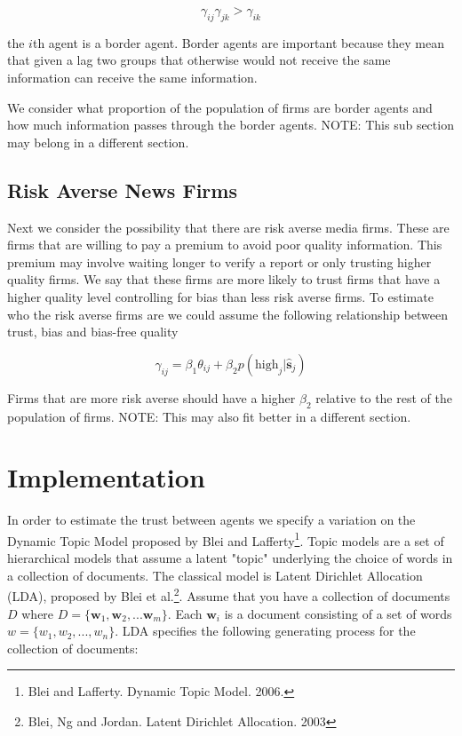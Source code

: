 \documentclass[a4paper]{article}
\begin{document}
\[\gamma_{ij}\gamma_{jk} > \gamma_{ik}\]

the $i$th agent is a border agent.  Border agents are important because they mean that given a lag two groups that otherwise would not receive the same information can receive the same information.

We consider what proportion of the population of firms are border agents and how much information passes through the border agents.  NOTE: This sub section may belong in a different section.

\subsection{Risk Averse News Firms}

Next we consider the possibility that there are risk averse media firms.  These are firms that are willing to pay a premium to avoid poor quality information.  This premium may involve waiting longer to verify a report or only trusting higher quality firms.  We say that these firms are more likely to trust firms that have a higher quality level controlling for bias than less risk averse firms.  To estimate who the risk averse firms are we could assume the following relationship between trust, bias and bias-free quality

\[\gamma_{ij} = \beta_1 \theta_{ij} + \beta_2 p(\text{high}_j|\hat{\textbf{s}}_j)\]

Firms that are more risk averse should have a higher $\beta_2$ relative to the rest of the population of firms. NOTE: This may also fit better in a different section.

\section{Implementation}

In order to estimate the trust between agents we specify a variation on the Dynamic Topic Model proposed by Blei and Lafferty\footnote{Blei and Lafferty. Dynamic Topic Model. 2006.}.  Topic models are a set of hierarchical models that assume a latent "topic" underlying the choice of words in a collection of documents.  The classical model is Latent Dirichlet Allocation (LDA), proposed by Blei et al.\footnote{Blei, Ng and Jordan. Latent Dirichlet Allocation. 2003}.  Assume that you have a collection of documents $D$ where $D = \{\textbf{w}_1, \textbf{w}_2, ... \textbf{w}_m\}$.  Each $\textbf{w}_i$ is a document consisting of a set of words $w = \{w_1, w_2, ..., w_n\}$.  LDA specifies the following generating process for the collection of documents:
\end{document}
